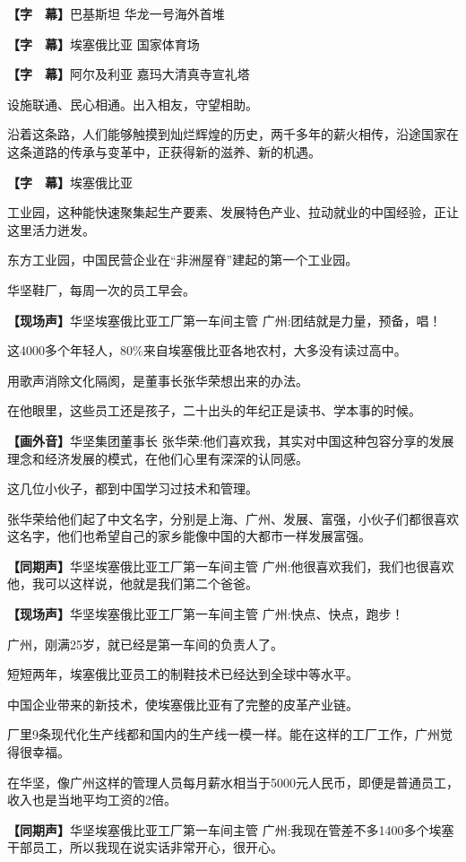 \documentclass{ctexart}
\newcommand{\zkh}[1]{\textbf{\hspace{-2.7em} 【#1】}}
\begin{document}
\zkh{字　幕}巴基斯坦 华龙一号海外首堆

\zkh{字　幕}埃塞俄比亚 国家体育场

\zkh{字　幕}阿尔及利亚 嘉玛大清真寺宣礼塔

设施联通、民心相通。出入相友，守望相助。

沿着这条路，人们能够触摸到灿烂辉煌的历史，两千多年的薪火相传，沿途国家在这条道路的传承与变革中，正获得新的滋养、新的机遇。

\zkh{字　幕}埃塞俄比亚

工业园，这种能快速聚集起生产要素、发展特色产业、拉动就业的中国经验，正让这里活力迸发。

东方工业园，中国民营企业在``非洲屋脊''建起的第一个工业园。

华坚鞋厂，每周一次的员工早会。

\zkh{现场声}华坚埃塞俄比亚工厂第一车间主管 广州:团结就是力量，预备，唱！

这4000多个年轻人，80{\%}来自埃塞俄比亚各地农村，大多没有读过高中。

用歌声消除文化隔阂，是董事长张华荣想出来的办法。

在他眼里，这些员工还是孩子，二十出头的年纪正是读书、学本事的时候。

\zkh{画外音}华坚集团董事长 张华荣:他们喜欢我，其实对中国这种包容分享的发展理念和经济发展的模式，在他们心里有深深的认同感。

这几位小伙子，都到中国学习过技术和管理。

张华荣给他们起了中文名字，分别是上海、广州、发展、富强，小伙子们都很喜欢这名字，他们也希望自己的家乡能像中国的大都市一样发展富强。

\zkh{同期声}华坚埃塞俄比亚工厂第一车间主管 广州:他很喜欢我们，我们也很喜欢他，我可以这样说，他就是我们第二个爸爸。

\zkh{现场声}华坚埃塞俄比亚工厂第一车间主管 广州:快点、快点，跑步！

广州，刚满25岁，就已经是第一车间的负责人了。

短短两年，埃塞俄比亚员工的制鞋技术已经达到全球中等水平。

中国企业带来的新技术，使埃塞俄比亚有了完整的皮革产业链。

厂里9条现代化生产线都和国内的生产线一模一样。能在这样的工厂工作，广州觉得很幸福。

在华坚，像广州这样的管理人员每月薪水相当于5000元人民币，即便是普通员工，收入也是当地平均工资的2倍。

\zkh{同期声}华坚埃塞俄比亚工厂第一车间主管 广州:我现在管差不多1400多个埃塞干部员工，所以我现在说实话非常开心，很开心。
\end{document}
